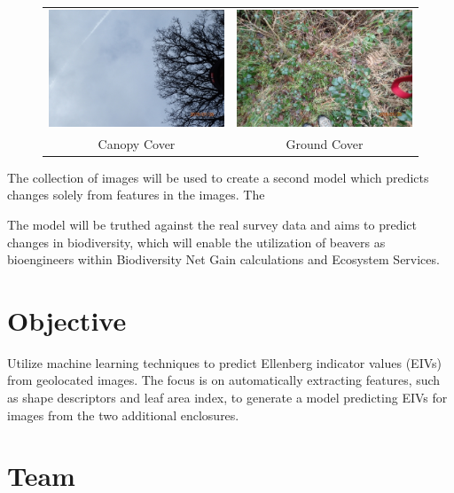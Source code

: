 \documentclass{roles}
\begin{document}
\begin{figure}[H]
  \centering
  \begin{tabular}{cc}
    \includegraphics[width=0.45\linewidth]{../images/survey-up.jpg} &
    \includegraphics[width=0.45\linewidth]{../images/survey-down.jpg} \\
    Canopy Cover & Ground Cover\\
  \end{tabular}
\end{figure}

The collection of images will be used to create a second model which predicts changes
solely from features in the images.
The 





The model will be truthed against the real survey data and aims to predict changes in biodiversity,
which will enable the utilization of beavers as bioengineers within Biodiversity Net Gain calculations and Ecosystem Services. 

\section*{Objective}

Utilize machine learning techniques to predict Ellenberg indicator values (EIVs)
from geolocated images.
The focus is on automatically extracting features,
such as shape descriptors and leaf area index,
to generate a model predicting EIVs for images from the two additional enclosures.

\section*{Team}
\end{document}
